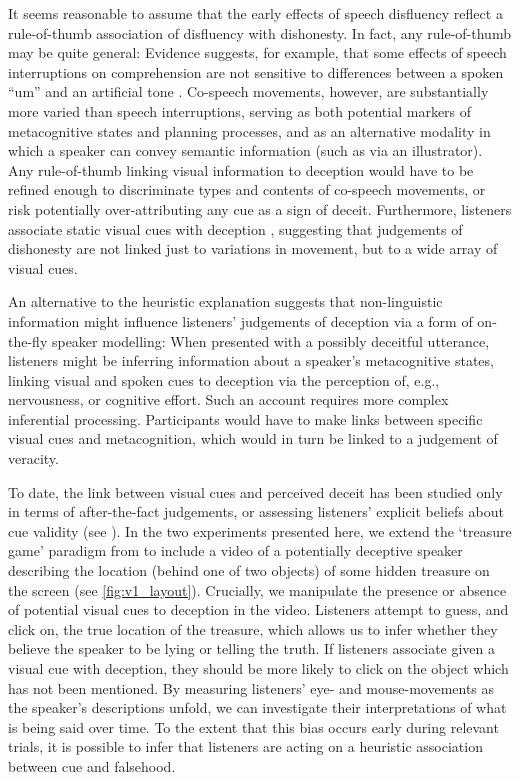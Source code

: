 \documentclass[a4paper,man,natbib]{apa6}
\newcommand*{\spex}[1]{``{#1}''} %
\begin{document}
It seems reasonable to assume that the early effects of speech disfluency reflect a rule-of-thumb association of disfluency with dishonesty.
In fact, any rule-of-thumb may be quite general:  Evidence suggests, for example, that some effects of speech interruptions on comprehension are not sensitive to differences between a spoken \spex{um} and an artificial tone \citep{Corley2011}.
Co-speech movements, however, are substantially more varied than speech interruptions, serving as both potential markers of metacognitive states and planning processes, and as an alternative modality in which a speaker can convey semantic information (such as via an illustrator).
Any rule-of-thumb linking visual information to deception would have to be refined enough to discriminate types and contents of co-speech movements, or risk potentially over-attributing any cue as a sign of deceit.
Furthermore, listeners associate static visual cues with deception \citep[e.g. eye-gaze,][]{Zuckerman1981a}, suggesting that judgements of dishonesty are not linked just to variations in movement, but to a wide array of visual cues. 

An alternative to the heuristic explanation suggests that non-linguistic information might influence listeners' judgements of deception via a form of on-the-fly speaker modelling: 
When presented with a possibly deceitful utterance, listeners might be inferring information about a speaker's metacognitive states, linking visual and spoken cues to deception via the perception of, e.g., nervousness, or cognitive effort. 
Such an account requires more complex inferential processing.
Participants would have to make links between specific visual cues and metacognition, which would in turn be linked to a judgement of veracity.

To date, the link between visual cues and perceived deceit has been studied only in terms of after-the-fact judgements, or assessing listeners' explicit beliefs about cue validity (see \citealt{Vrij1996a, Zuckerman1981a}).
In the two experiments presented here, we extend the `treasure game' paradigm from \citet{Loy2017} to include a video of a potentially deceptive speaker describing the location (behind one of two objects) of some hidden treasure on the screen (see \ref{fig:v1_layout}).
Crucially, we manipulate the presence or absence of potential visual cues to deception in the video.
Listeners attempt to guess, and click on, the true location of the treasure, which allows us to infer whether they believe the speaker to be lying or telling the truth.
If listeners associate given a visual cue with deception, they should be more likely to click on the object which has not been mentioned.
By measuring listeners' eye- and mouse-movements as the speaker's descriptions unfold, we can investigate their interpretations of what is being said over time.
To the extent that this bias occurs early during relevant trials, it is possible to infer that listeners are acting on a heuristic association between cue and falsehood.
\end{document}
